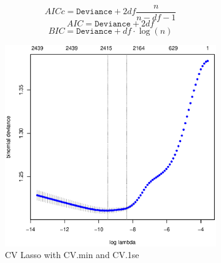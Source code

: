 \documentclass[11pt, fleqn]{article}
\begin{document}
\begin{equation}
  AICc = \texttt{Deviance} + 2df\frac{n}{n-df-1}
  \label{eq:AICc}
\end{equation}
\begin{equation}
  AIC = \texttt{Deviance} + 2df
  \label{eq:AIC}
\end{equation}
\begin{equation}
  BIC = \texttt{Deviance} + df \cdot \log(n)
  \label{eq:BIC}
\end{equation}

\begin{figure}
  \centering
  \begin{subfigure}[b]{0.49\textwidth}
    \includegraphics[width=\textwidth]{pl_cv_nhl_gamlr_a.eps}
    \caption{CV Lasso with CV.min and CV.1se}
    \label{fig:pl_cv_nhl}
  \end{subfigure}
  \hfill
  \begin{subfigure}[b]{0.49\textwidth}

\end{subfigure}
\end{figure}
\end{document}

